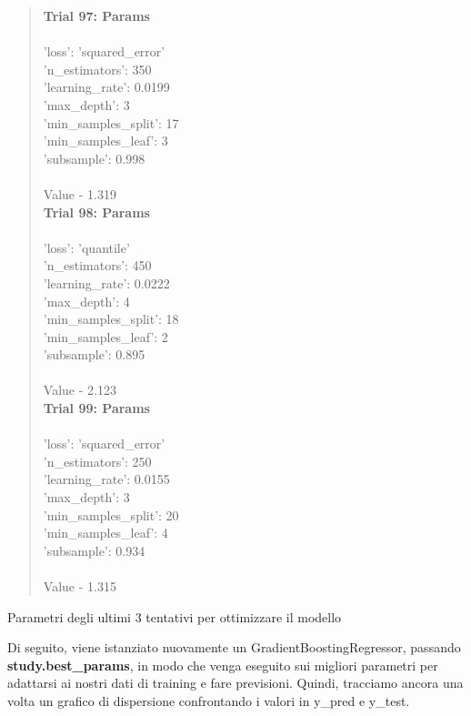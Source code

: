 \documentclass{article}
\begin{document}
\begin{quote}
\begin{multicols}{3}
    \textbf{Trial 97: Params}\\\\
    {'loss': 'squared\_error'\\
    'n\_estimators': 350\\
    'learning\_rate': 0.0199\\
    'max\_depth': 3\\
    'min\_samples\_split': 17\\
    'min\_samples\_leaf': 3\\
    'subsample': 0.998}\\ \\
    Value - 1.319
\columnbreak \\
\textbf{Trial 98: Params}\\\\
{'loss': 'quantile'\\
'n\_estimators': 450\\
'learning\_rate': 0.0222\\
'max\_depth': 4\\
'min\_samples\_split': 18\\
'min\_samples\_leaf': 2\\
'subsample': 0.895}\\\\
Value - 2.123
\columnbreak \\
\textbf{Trial 99: Params}\\\\
{'loss': 'squared\_error'\\
'n\_estimators': 250\\
'learning\_rate': 0.0155\\
'max\_depth': 3\\
'min\_samples\_split': 20\\
'min\_samples\_leaf': 4\\
'subsample': 0.934}\\\\
Value - 1.315
\end{multicols}
\end{quote}
\begin{center}
    Parametri degli ultimi 3 tentativi per ottimizzare il modello 
\end{center}
Di seguito, viene istanziato nuovamente un GradientBoostingRegressor, passando \textbf{study.best\_params}, in modo che venga eseguito sui migliori parametri per adattarsi ai nostri dati di training e fare previsioni. Quindi, tracciamo ancora una volta un grafico di dispersione confrontando i valori in y\_pred e y\_test.
\end{document}
